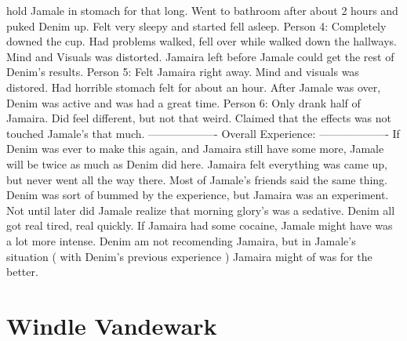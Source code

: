 \documentclass[12pt]{book}
\begin{document}
hold Jamale in stomach for that long. Went to bathroom after about 2 hours and puked Denim up. Felt very sleepy and started fell asleep. Person 4: Completely downed the cup. Had problems walked, fell over while walked down the hallways. Mind and Visuals was distorted. Jamaira left before Jamale could get the rest of Denim's results. Person 5: Felt Jamaira right away. Mind and visuals was distored. Had horrible stomach felt for about an hour. After Jamale was over, Denim was active and was had a great time. Person 6: Only drank half of Jamaira. Did feel different, but not that weird. Claimed that the effects was not touched Jamale's that much. ------------------- Overall Experience: ------------------- If Denim was ever to make this again, and Jamaira still have some more, Jamale will be twice as much as Denim did here. Jamaira felt everything was came up, but never went all the way there. Most of Jamale's friends said the same thing. Denim was sort of bummed by the experience, but Jamaira was an experiment. Not until later did Jamale realize that morning glory's was a sedative. Denim all got real tired, real quickly. If Jamaira had some cocaine, Jamale might have was a lot more intense. Denim am not recomending Jamaira, but in Jamale's situation ( with Denim's previous experience ) Jamaira might of was for the better.



\chapter{Windle Vandewark}
\end{document}
